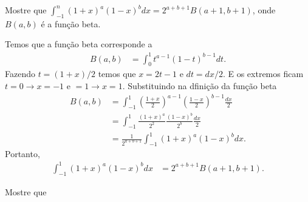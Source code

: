 \documentclass[a4paper,12pt, leqno, answers]{exam}
\begin{document}
\begin{questions}
    \question Mostre que $\int_{-1}^n \left( 1 + x \right)^a \left( 1 - x \right)^b dx = 2^{a + b + 1} B(a + 1, b + 1)$, onde $B(a, b)$ \'{e} a fun\c{c}\~{a}o beta.
    \begin{solution}
        Temos que a fun\c{c}\~{a}o beta corresponde a
        \begin{align*}
            B(a, b) &= \int_0^1 t^{a - 1} (1 - t)^{b - 1} dt.
        \end{align*}
        Fazendo $t = (1 + x)/2$ temos que $x = 2t - 1$ e $dt = dx/2$. E os extremos ficam $t = 0 \to x = -1$ e $ = 1 \to x = 1$. Substituindo na dfini\c{c}\~{a}o da fun\c{c}\~{a}o beta
        \begin{align*}
            B(a, b) &= \int_{-1}^1 \left( \frac{1 + x}{2} \right)^{a - 1} \left( \frac{1 - x}{2} \right)^{b - 1} \frac{dx}{2} \\
            &= \int_{-1}^1 \frac{(1 + x)^a}{2^2} \frac{(1 - x)^b}{2^b} \frac{dx}{2} \\
            &= \frac{1}{2^{a + b + 1}} \int_{-1}^1 (1 + x)^a (1 - x)^b dx.
        \end{align*}
        Portanto,
        \begin{align*}
            \int_{-1}^1 (1 + x)^a (1 - x)^b dx &= 2^{a + b + 1} B(a + 1, b + 1).
        \end{align*}
    \end{solution}

    \question Mostre que
\end{questions}
\end{document}
